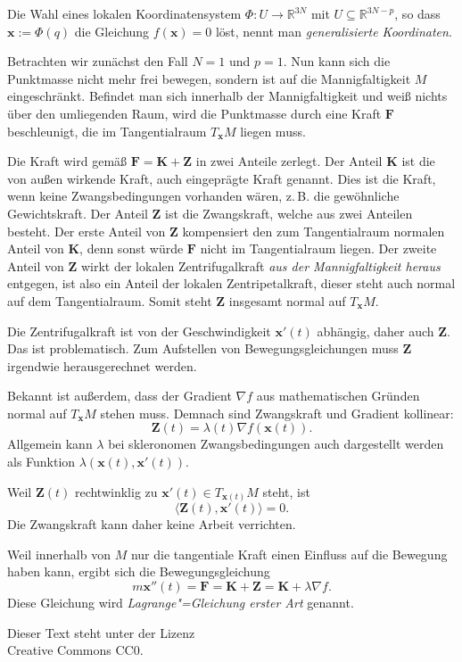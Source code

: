 \documentclass[a4paper,11pt,fleqn,twocolumn,twoside,dvipdfmx]{scrartcl}
\numberwithin{equation}{section}
\newcommand{\bvec}[1]{\mathbf{#1}}
\newcommand{\R}{\mathbb R}
\begin{document}
Die Wahl eines lokalen Koordinatensystem $\Phi\colon U\to\R^{3N}$ mit
$U\subseteq\R^{3N-p}$, so dass $\bvec x := \Phi(q)$ die Gleichung
$f(\bvec x)=0$ löst, nennt man \emph{generalisierte Koordinaten}.

Betrachten wir zunächst den Fall $N=1$ und $p=1$. Nun kann sich die
Punktmasse nicht mehr frei bewegen, sondern ist auf die
Mannigfaltigkeit $M$ eingeschränkt. Befindet man sich innerhalb
der Mannigfaltigkeit und weiß nichts über den umliegenden Raum,
wird die Punktmasse durch eine Kraft $\bvec F$ beschleunigt,
die im Tangentialraum $T_{\bvec x} M$ liegen muss.

Die Kraft wird gemäß $\bvec F = \bvec K+\bvec Z$ in zwei
Anteile zerlegt. Der Anteil $\bvec K$ ist die von außen wirkende
Kraft, auch eingeprägte Kraft genannt. Dies ist die Kraft, wenn keine
Zwangsbedingungen vorhanden wären, z.\,B. die gewöhnliche
Gewichtskraft. Der Anteil $\bvec Z$
ist die Zwangskraft, welche aus zwei Anteilen besteht. Der erste
Anteil von $\bvec Z$ kompensiert den zum Tangentialraum normalen
Anteil von $\bvec K$, denn sonst würde $\bvec F$ nicht im
Tangentialraum liegen. Der zweite Anteil von $\bvec Z$ wirkt
der lokalen Zentrifugalkraft \emph{aus der Mannigfaltigkeit heraus}
entgegen, ist also ein Anteil der lokalen Zentripetalkraft, dieser
steht auch normal auf dem Tangentialraum. Somit steht $\bvec Z$
insgesamt normal auf $T_{\bvec x} M$.

Die Zentrifugalkraft ist von der Geschwindigkeit $\bvec x'(t)$
abhängig, daher auch $\bvec Z$. Das ist problematisch.
Zum Aufstellen von Bewegungsgleichungen muss $\bvec Z$ irgendwie
herausgerechnet werden.

Bekannt ist außerdem, dass der Gradient $\nabla f$ aus
mathematischen Gründen normal auf $T_{\bvec x} M$ stehen muss.
Demnach sind Zwangskraft und Gradient kollinear:%
\begin{equation}
\bvec Z(t) = \lambda(t)\nabla f(\bvec x(t)).
\end{equation}
Allgemein kann $\lambda$ bei skleronomen Zwangsbedingungen
auch dargestellt werden als Funktion
$\lambda(\bvec x(t),\bvec x'(t))$.

Weil $\bvec Z(t)$ rechtwinklig zu $\bvec x'(t)\in T_{\bvec x(t)} M$
steht, ist
\begin{equation}
\langle\bvec Z(t),\bvec x'(t)\rangle = 0.
\end{equation}
Die Zwangskraft kann daher keine Arbeit verrichten.

Weil innerhalb von $M$ nur die tangentiale Kraft einen Einfluss auf
die Bewegung haben kann, ergibt sich die Bewegungsgleichung
\begin{equation}
m\bvec x''(t) = \bvec F = \bvec K+\bvec Z = \bvec K+\lambda\nabla f.
\end{equation}
Diese Gleichung wird \emph{Lagrange"=Gleichung erster Art} genannt.

\vfill\noindent
Dieser Text steht unter der Lizenz\\
Creative Commons CC0.
\end{document}
